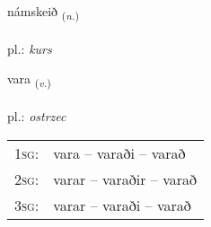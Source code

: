\documentclass[frontgrid, backgrid]{flacards}\usepackage[]{graphicx}\usepackage[]{xcolor}
\begin{document}
\renewcommand{\flhead}{\vskip5pt \fboxsep=0pt {\small\bfseries\footnotesize Nafnorð | Noun}}
\renewcommand{\fcfoot}{\vskip5pt \fboxsep=0pt \hspace{2pt}{\small\bfseries\footnotesize 2K}}

\renewcommand{\blhead}{\vskip5pt {\small\bfseries\footnotesize Nafnorð | Noun }}
\renewcommand{\bcfoot}{\vskip5pt \hspace{2pt}{\small\bfseries\footnotesize 2K}}


{námskeið \small{\textsubscript{(\textit{n.})}} \\[1ex] %
\textphonetic{[naumsceið]} \\
pl.: \emph{kurs} \\  [2ex]
\renewcommand*{\arraystretch}{0.8}
}

\renewcommand{\flhead}{\vskip5pt \fboxsep=0pt {\small\bfseries\footnotesize Sagnorð | Verb}}
\renewcommand{\fcfoot}{\vskip5pt \fboxsep=0pt \hspace{2pt}{\small\bfseries\footnotesize 2K}}

\renewcommand{\blhead}{\vskip5pt {\small\bfseries\footnotesize Sagnorð | Verb }}
\renewcommand{\bcfoot}{\vskip5pt \hspace{2pt}{\small\bfseries\footnotesize 2K}}


{vara \small{\textsubscript{(\textit{v.})}} \\[1ex] %
\textphonetic{[vaːra]} \\
pl.: \emph{ostrzec} \\  [2ex]
\renewcommand*{\arraystretch}{0.8}
\begin{tabular}{p{1cm}l}
\textsc{1sg}: & vara -- varaði -- varað \\ 
\textsc{2sg}: & varar -- varaðir -- varað \\ 
\textsc{3sg}: & varar -- varaði -- varað \\ 
\end{tabular}
}
\end{document}
